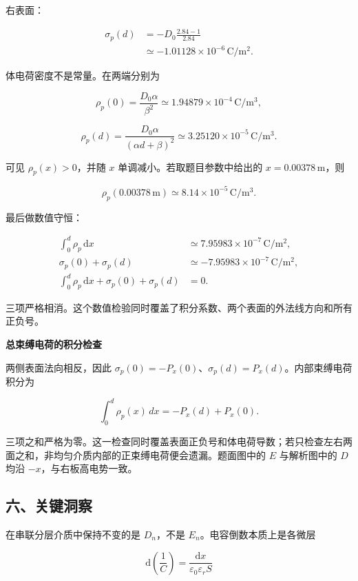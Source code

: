 \documentclass[12pt,a4paper,UTF8]{ctexart}
\begin{document}
右表面：

\[
\begin{aligned}
\sigma_p(d)
&=-D_0\frac{2.84-1}{2.84}\\
&\simeq-1.01128\times10^{-6}\,
\mathrm{C/m^2}.
\end{aligned}
\tag{17}
\]

\begingroup
\samepage

体电荷密度不是常量。在两端分别为

\[
\rho_p(0)
=\frac{D_0\alpha}{\beta^2}
\simeq1.94879\times10^{-4}\,
\mathrm{C/m^3},
\tag{18}
\]

\[
\rho_p(d)
=\frac{D_0\alpha}{(\alpha d+\beta)^2}
\simeq3.25120\times10^{-5}\,
\mathrm{C/m^3}.
\tag{19}
\]

可见 \(\rho_p(x)>0\)，并随 \(x\) 单调减小。若取题目参数中给出的
\(x=0.00378\,\mathrm m\)，则

\[
\boxed{
\rho_p(0.00378\,\mathrm m)
\simeq8.14\times10^{-5}\,\mathrm{C/m^3}
}.
\tag{20}
\]

最后做数值守恒：

\[
\begin{aligned}
\int_0^d\rho_p\,\mathrm dx
&\simeq7.95983\times10^{-7}\,\mathrm{C/m^2},\\
\sigma_p(0)+\sigma_p(d)
&\simeq-7.95983\times10^{-7}\,\mathrm{C/m^2},\\
\int_0^d\rho_p\,\mathrm dx+\sigma_p(0)+\sigma_p(d)&=0.
\end{aligned}
\]

三项严格相消。这个数值检验同时覆盖了积分系数、两个表面的外法线方向和所有正负号。

\endgroup

\textbf{总束缚电荷的积分检查}

两侧表面法向相反，因此
\(\sigma_p(0)=-P_x(0)\)、\(\sigma_p(d)=P_x(d)\)。内部束缚电荷积分为

\[\int_0^d\rho_p(x)\,dx=-P_x(d)+P_x(0).\]

三项之和严格为零。这一检查同时覆盖表面正负号和体电荷导数；若只检查左右两面之和，非均匀介质内部的正束缚电荷便会遗漏。题面图中的
\(E\) 与解析图中的 \(D\) 均沿 \(-x\)，与右板高电势一致。

\subsection{六、关键洞察}\label{ux516dux5173ux952eux6d1eux5bdf-1}

在串联分层介质中保持不变的是 \(D_n\)，不是
\(E_n\)。电容倒数本质上是各微层

\[
\mathrm d\!\left(\frac1C\right)
=\frac{\mathrm dx}{\varepsilon_0\varepsilon_rS}
\]
\end{document}
